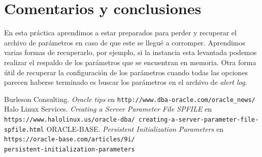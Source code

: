 \documentclass{article}
\begin{document}
\section*{Comentarios y conclusiones}

En esta práctica aprendimos a estar preparados para perder y recuperar el
archivo de parámetros en caso de que este se llegué a corromper. 
Aprendimos varias formas de recuperarlo, por ejemplo, si la instancia esta 
levantada podemos realizar el respaldo de los parámetros que se encuentran en
memoria. Otra forma útil de recuperar la configuración de los parámetros cuando
todas las opciones parecen haberse terminado es buscar los parámetros en el 
archivo de \textit{alert log}.

\renewcommand\refname{Bibliografía y referencias}
\begin{thebibliography}{99}
     Burleson Consulting. \textit{Oracle tips } en 
    \texttt{http://www.dba-oracle.com/oracle\_news/}
      Halo Linux Services. \textit{Creating a Server Parameter 
    File SPFILE} en 
    \texttt{https://www.halolinux.us/oracle-dba/
    creating-a-server-parameter-file-spfile.html}
     ORACLE-BASE. \textit{Persistent Initialization 
    Parameters} en 
    \texttt{
        https://oracle-base.com/articles/9i/\\
        persistent-initialization-parameters
    }
\end{thebibliography}
\end{document}
